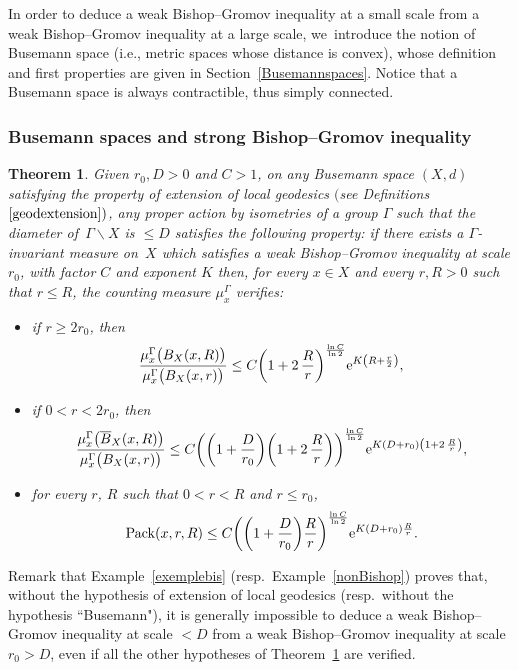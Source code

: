 \documentclass[pdftex]{sigma}
\numberwithin{equation}{section}
\newtheorem{theor}{Theorem}[section]
\begin{document}
In order to deduce a weak Bishop--Gromov inequality at a small scale from
a weak Bishop--Gromov
inequality at a large scale, we~introduce the notion of Busemann space (i.e., metric spaces whose distance is convex), whose definition and first
properties
are given in Section~\ref{Busemannspaces}. Notice that a Busemann space is always contractible, thus simply connected.


\subsubsection{Busemann spaces and strong Bishop--Gromov inequality}\label{strengthenBishop0}

\begin{theor}\label{strengthenBishop}
Given $r_0, D > 0$ and $C > 1$, on any Busemann space $(X,d)$ satisfying
the property of extension of local geodesics $($see Definitions~$\ref{geodextension})$, any proper action by isometries of a group $\Gamma$ such that the diameter of~$\Gamma \backslash X$ is $\le D$ satisfies the following property:
if there exists a $\Gamma$-invariant measure on~$X$ which satisfies a weak Bishop--Gromov inequality at scale $r_0$, with factor $C$
and exponent $K$ then, for every $x \in X$ and every $r, R> 0$ such that $r \le R$, the counting measure $\mu_{x}^{\Gamma}$ verifies:
\begin{itemize}\itemsep=0pt
\item[$(i)$]
if $r \ge 2 r_0 $, then
\[
\dfrac{\mu_{x}^{\Gamma} \big(B_X( x, R)\big)}{\mu_{x}^{\Gamma}
\big(B_X (x, r)\big)} \le C
\bigg(1 +2\,\dfrac{R}{r} \bigg)^{\frac{\ln C}{\ln 2}}{\rm e}^{K \left(R + \frac{r}{2}\right)},
\]
\item[$(ii)$]
if $0 < r <2 r_0$, then
\[
\dfrac{\mu_{x}^{\Gamma} \big(\overline B_X(x, R)\big)}{\mu_{x}^{\Gamma} \big(B_X (x, r)\big)} \le C \bigg(\bigg(1 + \dfrac{D}{r_0}\bigg)\bigg(1 +2\,\dfrac{R}{r}\bigg)\bigg)^{\frac{\ln C}{\ln 2}}
{\rm e}^{K (D+ r_0) \left(1 +2\,\frac{R}{r}\right)},
\]
\item[$(iii)$]
for every $r$, $R$ such that $0 < r < R$ and $r \le r_0$,
\[
{\rm Pack} (x, r, R) \le C \bigg(\bigg(1 + \dfrac{D}{r_0}\bigg) \frac{R}{r} \bigg)^{\frac{\ln C}{\ln 2}} {\rm e}^{K (D+ r_0) \frac{R}{r}}.
\]
\end{itemize}
\end{theor}

 Remark that Example~\ref{exemplebis} (resp.\ Example~\ref{nonBishop}) proves that, without the hypothesis of extension of local geodesics (resp.\ without
the hypothesis ``Busemann"), it is generally impossible to deduce a
weak Bishop--Gromov inequality at scale $< D$ from a weak Bishop--Gromov inequality
at scale $r_0 > D$, even if all the other hypotheses of Theorem~\ref{strengthenBishop} are verified.
\end{document}
